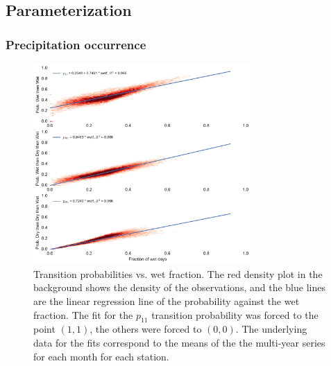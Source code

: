 \begin{refsection}
\subsection{Parameterization} \label{sec:param}

\subsubsection{Precipitation occurrence} \label{sec:markov}

\begin{figure}
	\includegraphics[width=8.3cm]{Figures/f03.pdf}
	\caption[Transition probabilities vs. wet fraction]{Transition probabilities vs. wet fraction. The red density plot in the background shows the density of the observations, and the blue lines are the linear regression line of the probability against the wet fraction. The fit for the $p_{11}$ transition probability was forced to the point $(1, 1)$, the others were forced to $(0, 0)$. The underlying data for the fits correspond to the means of the the multi-year series for each month for each station.}
	\label{fig:markov}
\end{figure}


\end{refsection}
